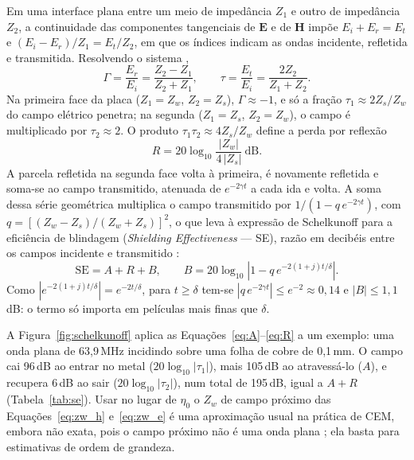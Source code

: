 \documentclass[portuguese]{sbcreviews-2025}%
\begin{document}
Em uma interface plana entre um meio de impedância $Z_1$ e outro de impedância $Z_2$, a continuidade das componentes tangenciais de $\mathbf{E}$ e de $\mathbf{H}$ impõe $E_i + E_r = E_t$ e $(E_i - E_r)/Z_1 = E_t/Z_2$, em que os índices indicam as ondas incidente, refletida e transmitida. Resolvendo o sistema \citep{pozar2012},
\begin{equation}
\Gamma = \frac{E_r}{E_i} = \frac{Z_2 - Z_1}{Z_2 + Z_1}, \qquad \tau = \frac{E_t}{E_i} = \frac{2Z_2}{Z_1 + Z_2}.
\label{eq:tau}
\end{equation}
Na primeira face da placa ($Z_1 = Z_w$, $Z_2 = Z_s$), $\Gamma \approx -1$, e só a fração $\tau_1 \approx 2Z_s/Z_w$ do campo elétrico penetra; na segunda ($Z_1 = Z_s$, $Z_2 = Z_w$), o campo é multiplicado por $\tau_2 \approx 2$. O produto $\tau_1\tau_2 \approx 4Z_s/Z_w$ define a perda por reflexão
\begin{equation}
R = 20\log_{10}\frac{|Z_w|}{4\,|Z_s|}\ \mathrm{dB}.
\label{eq:R}
\end{equation}
A parcela refletida na segunda face volta à primeira, é novamente refletida e soma-se ao campo transmitido, atenuada de $e^{-2\gamma t}$ a cada ida e volta. A soma dessa série geométrica multiplica o campo transmitido por $1/(1 - q\,e^{-2\gamma t})$, com $q = [(Z_w - Z_s)/(Z_w + Z_s)]^2$, o que leva à expressão de Schelkunoff para a eficiência de blindagem (\textit{Shielding Effectiveness} --- SE), razão em decibéis entre os campos incidente e transmitido \citep{ott2009}:
\begin{equation}
\mathrm{SE} = A + R + B, \qquad B = 20\log_{10}\left|1 - q\,e^{-2(1+j)t/\delta}\right|.
\label{eq:schelkunoff}
\end{equation}
Como $|e^{-2(1+j)t/\delta}| = e^{-2t/\delta}$, para $t \ge \delta$ tem-se $|q\,e^{-2\gamma t}| \le e^{-2} \approx 0{,}14$ e $|B| \le 1{,}1$\,dB: o termo só importa em películas mais finas que $\delta$.

A Figura~\ref{fig:schelkunoff} aplica as Equações~\eqref{eq:A}--\eqref{eq:R} a um exemplo: uma onda plana de 63,9\,MHz incidindo sobre uma folha de cobre de 0,1\,mm. O campo cai 96\,dB ao entrar no metal ($20\log_{10}|\tau_1|$), mais 105\,dB ao atravessá-lo ($A$), e recupera 6\,dB ao sair ($20\log_{10}|\tau_2|$), num total de 195\,dB, igual a $A + R$ (Tabela~\ref{tab:se}). Usar no lugar de $\eta_0$ o $Z_w$ de campo próximo das Equações~\eqref{eq:zw_h} e~\eqref{eq:zw_e} é uma aproximação usual na prática de CEM, embora não exata, pois o campo próximo não é uma onda plana \citep{ott2009}; ela basta para estimativas de ordem de grandeza.
\end{document}
